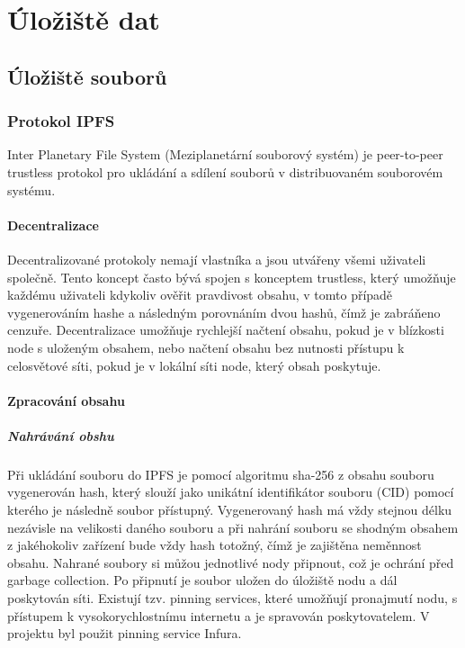 \documentclass[12pt, a4paper,
 twoside,        %
 openright
]{report}
\begin{document}
\chapter{Úložiště dat}
    \section{Úložiště souborů}
        \subsection{Protokol IPFS}
        Inter Planetary File System (Meziplanetární souborový systém) je peer-to-peer trustless protokol pro ukládání a sdílení souborů v distribuovaném souborovém systému.
        \subsubsection{Decentralizace}
            Decentralizované protokoly nemají vlastníka a jsou utvářeny všemi uživateli společně. Tento koncept často bývá spojen s konceptem trustless, který umožňuje každému uživateli kdykoliv ověřit pravdivost obsahu, v tomto případě vygenerováním hashe a následným porovnáním dvou hashů, čímž je zabráňeno cenzuře. Decentralizace umožňuje rychlejší načtení obsahu, pokud je v blízkosti node s uloženým obsahem, nebo načtení obsahu bez nutnosti přístupu k celosvětové síti, pokud je v lokální síti node, který obsah poskytuje.
        \subsubsection{Zpracování obsahu}
            \paragraph{Nahrávání obshu}
            Při ukládání souboru do IPFS je pomocí algoritmu sha-256 z obsahu souboru vygenerován hash, který slouží jako unikátní identifikátor souboru (CID) pomocí kterého je následně soubor přístupný. Vygenerovaný hash má vždy stejnou délku nezávisle na velikosti daného souboru a při nahrání souboru se shodným obsahem z jakéhokoliv zařízení bude vždy hash totožný, čímž je zajištěna neměnnost obsahu. Nahrané soubory si můžou jednotlivé nody připnout, což je ochrání před garbage collection. Po připnutí je soubor uložen do úložiště nodu a dál poskytován síti. Existují tzv. pinning services, které umožňují pronajmutí nodu, s přístupem k vysokorychlostnímu internetu a je spravován poskytovatelem. V projektu byl použit pinning service Infura. 
\end{document}
